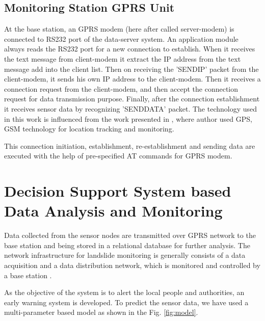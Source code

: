 \documentclass[conference]{IEEEtran}
\begin{document}
\subsection{Monitoring Station GPRS Unit}
At the base station, an GPRS modem (here after called server-modem) is connected to RS232 port of the data-server
system. An application module always reads the RS232 port for a new connection to establish. When it receives the text
message from client-modem it extract the IP address from the text message add into the client list. Then on receiving
the ’SENDIP’ packet from the client-modem, it sends his own IP address to the client-modem. Then it receives a
connection request from the client-modem, and then accept the connection request for data transmission purpose. Finally,
after the connection establishment it receives sensor data by recognizing ’SENDDATA’ packet. The technology used in this work is influenced from the work presented in \cite{sahooiitb}, where author used GPS, GSM technology for location tracking and monitoring.
\par
This connection initiation, establishment, re-establishment and sending data are executed with the help of pre-specified
AT commands for GPRS modem.

\section{Decision Support System based Data Analysis and Monitoring}
Data collected from the sensor nodes are transmitted over GPRS network to the base station and being stored in a
relational database for further analysis. The network infrastructure for landslide monitoring is generally consists of a data
acquisition and a data distribution network, which is monitored and controlled by a base station \cite{richard}.
\par
As the objective of the system is to alert the local people and authorities, an early warning system is developed. To predict
the sensor data, we have used a multi-parameter based model as shown in the Fig. \ref{fig:model}.
\end{document}
